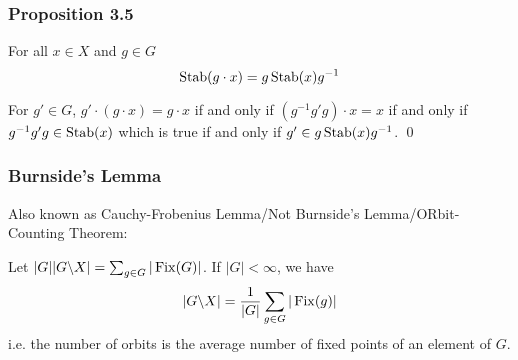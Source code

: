 \documentclass{article}
\renewenvironment{proof}{{\bfseries\color{blue1} Proof:}}{\qed}
\begin{document}
\subsubsection{Proposition 3.5}
\begin{idea}
    For all $x\in X$ and $g\in G$
    \begin{equation*}
        \operatorname{Stab}(g\cdot x)=g\operatorname{Stab}(x)g^{-1}
    \end{equation*}
\end{idea}
\begin{proof}
    For $g'\in G$, $g'\cdot (g\cdot x)=g\cdot x$ if and only if $(g^{-1}g'g)\cdot x = x$ if and only if $g^{-1}g'g\in \operatorname{Stab}(x)$ which is true if and only if $g'\in g\operatorname{Stab}(x)g^{-1}$.
\end{proof}
\subsubsection{Burnside's Lemma}
Also known as Cauchy-Frobenius Lemma/Not Burnside's Lemma/ORbit-Counting Theorem:
\begin{idea}
    Let $|G||G\text{\textbackslash} X|=\sum_{g\in G}|\operatorname{Fix}(G)|$. If $|G|<\infty$, we have
    \begin{equation*}
        |G\text{\textbackslash} X| = \frac{1}{|G|}\sum_{g\in G}|\operatorname{Fix}(g)|
    \end{equation*}
    i.e. the number of orbits is the average number of fixed points of an element of $G$.
\end{idea}
\end{document}
